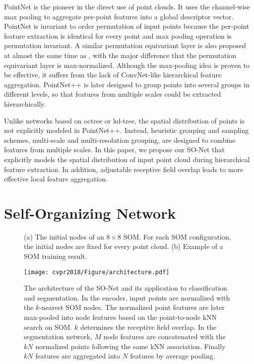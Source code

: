\documentclass[10pt,twocolumn,letterpaper]{article}
\begin{document}
PointNet \cite{qi2016pointnet} is the pioneer in the direct use of point clouds. It uses the channel-wise max pooling to aggregate per-point features into a global descriptor vector. PointNet is invariant to order permutation of input points because the per-point feature extraction is identical for every point and max pooling operation is permutation invariant. A similar permutation equivariant layer \cite{ravanbakhsh2016deep} is also proposed at almost the same time as \cite{qi2016pointnet}, with the major difference that the permutation equivariant layer is max-normalized. Although the max-pooling idea is proven to be effective, it suffers from the lack of ConvNet-like hierarchical feature aggregation. PointNet++ \cite{qi2017pointnet++} is later designed to group points into several groups in different levels, so that features from multiple scales could be extracted hierarchically.

Unlike networks based on octree or kd-tree, the spatial distribution of points is not explicitly modeled in PointNet++. Instead, heuristic grouping and sampling schemes, \eg multi-scale and multi-resolution grouping, are designed to combine features from multiple scales. In this paper, we propose our SO-Net that explicitly models the spatial distribution of input point cloud during hierarchical feature extraction. In addition, adjustable receptive field overlap leads to more effective local feature aggregation.





\section{Self-Organizing Network}
\begin{figure}[t!]
        \centering
        \caption{(a) The initial nodes of an $8\times 8$ SOM. For each SOM configuration, the initial nodes are fixed for every point cloud. (b) Example of a SOM training result.}
        \vspace{-4pt}
\end{figure}
\begin{figure*}[t!] \centering
\texttt{[image: cvpr2018/Figure/architecture.pdf]}
\caption{The architecture of the SO-Net and its application to classification and segmentation. In the encoder, input points are normalized with the $k$-nearest SOM nodes. The normalized point features are later max-pooled into node features based on the point-to-node kNN search on SOM. $k$ determines the receptive field overlap. In the segmentation network, $M$ node features are concatenated with the $kN$ normalized points following the same kNN association. Finally $kN$ features are aggregated into $N$ features by average pooling. }\label{fig_architecture}
\vspace{-4pt}
\end{figure*}
\end{document}
